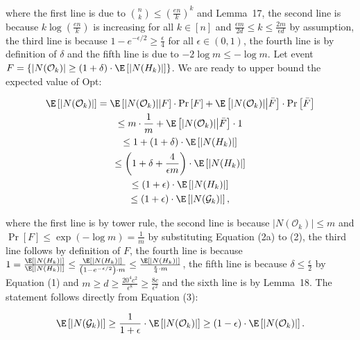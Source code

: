 \documentclass[10pt,a4paper]{article}
\begin{document}
where the first line is due to $\binom{n}{k}\leq\left(\frac{en}{k}\right)^{k}$ and Lemma 17, the second line is because $k\log\left(\frac{en}{k}\right)$ is increasing for all $k\in[n]$ and $\frac{\epsilon m}{2d}\leq k\leq\frac{2m}{\epsilon d}$ by assumption, the third line is because $1-e^{-\epsilon/2}\geq\frac{\epsilon}{4}$ for all $\epsilon\in(0,1)$, the fourth line is by definition of $\delta$ and the fifth line is due to $-2\log{m}\leq-\log{m}$.
Let event $F=\{|N(\mathcal{O}_{k})|\geq(1+\delta)\cdot\E\left[|N(H_{k})|\right]\}$.
We are ready to upper bound the expected value of Opt:\par


\[\begin{gathered}
\displaystyle\E\left[|N(\mathcal{O}_{k})|\right] \displaystyle=\E\left[|N(\mathcal{O}_{k})|\middle|F\right]\cdot\Pr\left[F\right]+\E\left[|N(\mathcal{O}_{k})|\middle|\bar{F}\right]\cdot\Pr\left[\bar{F}\right] \\
\displaystyle\leq m\cdot\frac{1}{m}+\E\left[|N(\mathcal{O}_{k})|\middle|\bar{F}\right]\cdot 1 \\
\displaystyle\leq 1+(1+\delta)\cdot\E\left[|N(H_{k})|\right] \\
\displaystyle\leq\left(1+\delta+\frac{4}{\epsilon m}\right)\cdot\E\left[|N(H_{k})|\right] \\
\displaystyle\leq\left(1+\epsilon\right)\cdot\E\left[|N(H_{k})|\right] \\
\displaystyle\leq\left(1+\epsilon\right)\cdot\E\left[|N(\mathcal{G}_{k})|\right],
\end{gathered}\]


where the first line is by tower rule, the second line is because $|N(\mathcal{O}_{k})|\leq m$ and $\Pr\left[F\right]\leq\exp\left(-\log{m}\right)=\frac{1}{m}$ by substituting Equation (2a) to (2), the third line follows by definition of $F$, the fourth line is because $1=\frac{\E\left[|N(H_{k})|\right]}{\E\left[|N(H_{k})|\right]}\leq\frac{\E\left[|N(H_{k})|\right]}{\left(1-e^{-\epsilon/2}\right)\cdot m}\leq\frac{\E\left[|N(H_{k})|\right]}{\frac{\epsilon}{4}\cdot m}$, the fifth line is because $\delta\leq\frac{\epsilon}{2}$ by Equation (1) and $m\geq d\geq\frac{20^{4}c^{2}}{\epsilon^{8}}\geq\frac{8c}{\epsilon^{2}}$ and the sixth line is by Lemma 18.
The statement follows directly from Equation (3):\par


\[\begin{gathered}
\displaystyle\E\left[|N(\mathcal{G}_{k})|\right]\geq\frac{1}{1+\epsilon}\cdot\E\left[|N(\mathcal{O}_{k})|\right]\geq\left(1-\epsilon\right)\cdot\E\left[|N(\mathcal{O}_{k})|\right].
\end{gathered}\]
\end{document}
